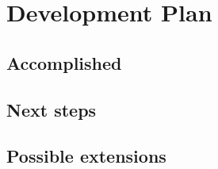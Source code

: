 \documentclass[10pt, a4paper]{report}
\begin{document}
\chapter{Development Plan}\label{ch:plan}

\section{Accomplished}\label{sec:acc}


\section{Next steps}\label{sec:next}



\section{Possible extensions}\label{sec:ext}




\end{document}
